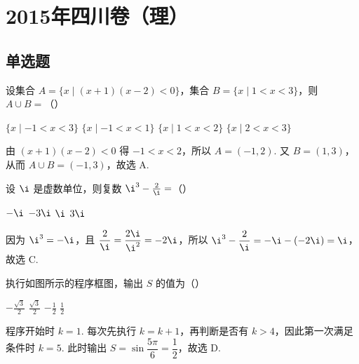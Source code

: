 \chapter{2015年四川卷（理）}

\section{单选题}

\begin{problem}
设集合 \(A = \{x \mid (x + 1)(x - 2) < 0\}\)，集合 \(B = \{x \mid 1 < x < 3\}\)，则 \(A \cup B =\)（\quad）

\choices
    {\(\{x\mid -1 < x < 3\}\)}
    {\(\{x\mid -1 < x < 1\}\)}
    {\(\{x\mid 1 < x < 2\}\)}
    {\(\{x\mid 2 < x < 3\}\)}


\begin{solution}
由 \((x+1)(x-2)<0\) 得 \(-1<x<2\)，所以 \(A=(-1,2)\). 又 \(B=(1,3)\)，从而 \(A\cup B=(-1,3)\)，故选 A.
\end{solution}
\end{problem}

\begin{problem}
设 \(\i\) 是虚数单位，则复数 \(\i^{3}-\frac{2}{\i}= \)（\quad）

\choices
    {\(-\i\)}
    {\(-3\i\)}
    {\(\i\)}
    {\(3\i\)}


\begin{solution}
因为 \(\i^{3}=-\i\)，且 \(\dfrac{2}{\i}=\dfrac{2\i}{\i^{2}}=-2\i\)，所以 \(\i^{3}-\dfrac{2}{\i}=-\i-(-2\i)=\i\)，故选 C.
\end{solution}
\end{problem}

\begin{problem}
执行如图所示的程序框图，输出 \(S\) 的值为（\quad）


\choices
    {\(-\frac{\sqrt{3}}{2}\)}
    {\(\frac{\sqrt{3}}{2}\)}
    {\(-\frac{1}{2}\)}
    {\(\frac{1}{2}\)}


\begin{solution}
程序开始时 \(k=1\). 每次先执行 \(k=k+1\)，再判断是否有 \(k>4\)，因此第一次满足条件时 \(k=5\). 此时输出
\(S=\sin\dfrac{5\pi}{6}=\dfrac12\)，故选 D.
\end{solution}
\end{problem}

